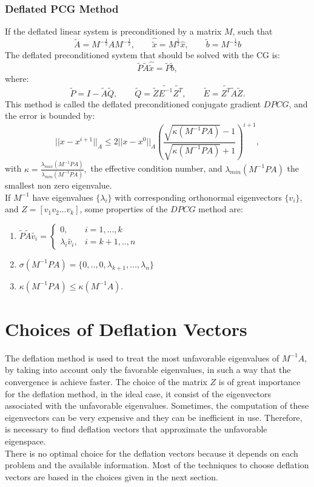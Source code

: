 \documentclass[12pt]{report}
\begin{document}
\subsubsection{Deflated PCG Method}
If the deflated linear system is preconditioned by a matrix $M$, such that
\begin{equation*}
 \tilde{A}=M^{-\frac{1}{2}}AM^{-\frac{1}{2}}, \qquad \hat{\tilde{x}}=M^{\frac{1}{2}}\hat{x}, \qquad
 \tilde{b}=M^{-\frac{1}{2}}b
\end{equation*}
The deflated preconditioned system that should be solved with the CG is:
$$\tilde{P} \tilde{A} \hat{\tilde{x}}=\tilde{P}\tilde{b},$$
where:
\begin{equation*}
 \tilde{P}=I-\tilde{A}\tilde{Q}, \qquad \tilde{Q}=\tilde{Z}\tilde{E^{-1}}\tilde{Z^T}, \qquad
 \tilde{E}=\tilde{Z^T}\tilde{A}\tilde{Z}.
\end{equation*}
This method is called the deflated preconditioned conjugate gradient $DPCG$, and the error is bounded by:
\begin{equation*}
 ||x-x^{i+1}||_A\leq 2||x-x^{0}||_A \left( \frac{\sqrt{\kappa(M^{-1}PA)}-1}{\sqrt{\kappa(M^{-1}PA)}+1} \right)^{i+1},
\end{equation*}
with $\kappa=\frac{\lambda_{max}(M^{-1}PA)}{\lambda_{min}(M^{-1}PA)},$ the effective condition number, and $\lambda_{min}(M^{-1}PA)$ the smallest non zero eigenvalue.\\
If $M^{-1}$ have eigenvalues $\{\lambda_i\}$ with corresponding orthonormal eigenvectors
 $\{v_i\}$, and $Z={[ v_{1} v_{2}... v_{k}]}$, some properties of the $DPCG$ method are:
\begin{enumerate}
 \item  $\tilde{P} \tilde{A} \tilde{v_i}= \begin{cases} 0, & i=1,...,k\\ \lambda_i\tilde{v_i}, & i=k+1,..,n \end{cases}$
 \item $\sigma(M^{-1}PA)=\{0,..,0,\lambda_{k+1},...,\lambda_n\}$
 \item $\kappa(M^{-1}PA) \leq \kappa(M^{-1}A).$
 \end{enumerate}
\section{Choices of Deflation Vectors}
The deflation method is used to treat the most unfavorable eigenvalues
of $M^{-1}A$, by taking into account only the favorable eigenvalues, 
in such a way that the convergence is achieve faster. 
The choice of the matrix $Z$ is of great importance for the deflation method, in the ideal case, it
consist of the eigenvectors associated with the unfavorable eigenvalues. Sometimes, the computation of these
eigenvectors can be very expensive and they can be inefficient in use. Therefore, is necessary
to find deflation vectors that approximate the unfavorable eigenspace.\\
There is no optimal choice for the deflation vectors because it depends on each problem and the available information.
Most of the techniques to choose deflation vectors are based in the choices given in the next section.
\end{document}
